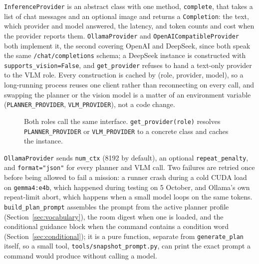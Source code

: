 \label{sec:inference}

\label{sec:planner}

\texttt{InferenceProvider} is an abstract class with one method,
\texttt{complete}, that takes a list of chat messages and an optional image
and returns a \texttt{Completion}: the text, which provider and model
answered, the latency, and token counts and cost when the provider reports
them. \texttt{OllamaProvider} and \texttt{OpenAICompatibleProvider} both
implement it, the second covering OpenAI and DeepSeek, since both speak the
same \texttt{/chat/completions} schema; a DeepSeek instance is constructed
with \texttt{supports\_vision=False}, and \texttt{get\_provider} refuses to
hand a text-only provider to the VLM role. Every construction is cached by
(role, provider, model), so a long-running process reuses one client rather
than reconnecting on every call, and swapping the planner or the vision
model is a matter of an environment variable
(\texttt{PLANNER\_PROVIDER}, \texttt{VLM\_PROVIDER}), not a code change.

\begin{figure}[htbp]
  \centering
  \caption{Both roles call the same interface. \texttt{get\_provider(role)} resolves \texttt{PLANNER\_PROVIDER} or \texttt{VLM\_PROVIDER} to a concrete class and caches the instance.}
  \label{fig:providers}
\end{figure}

\texttt{OllamaProvider} sends \texttt{num\_ctx} (8192 by default), an
optional \texttt{repeat\_penalty}, and \texttt{format="json"} for every
planner and VLM call. Two failures are retried once before being allowed to
fail a mission: a runner crash during a cold CUDA load on
\texttt{gemma4:e4b}, which happened during testing on 5 October, and
Ollama's own repeat-limit abort, which happens when a small model loops on
the same tokens. \texttt{build\_plan\_prompt} assembles the prompt from the
active planner profile (Section~\ref{sec:vocabulary}), the room digest when
one is loaded, and the conditional guidance block when the command contains
a condition word (Section~\ref{sec:conditional}); it is a pure function,
separate from \texttt{generate\_plan} itself, so a small tool,
\texttt{tools/snapshot\_prompt.py}, can print the exact prompt a command
would produce without calling a model.

